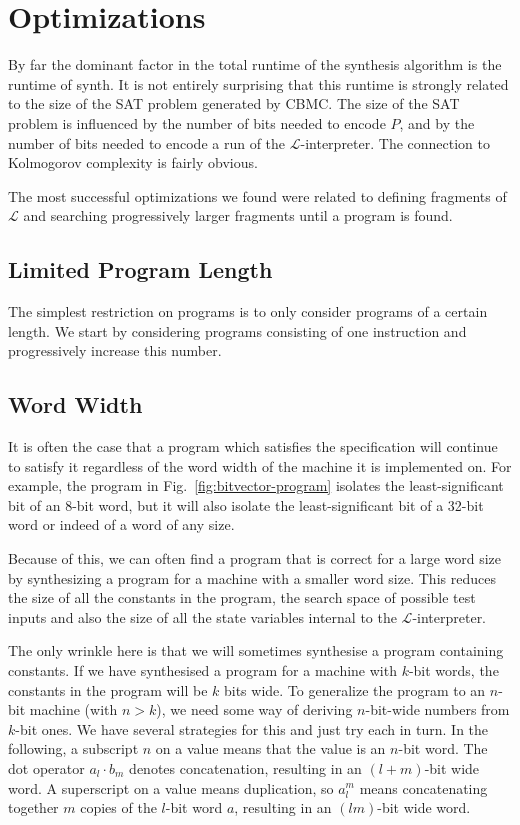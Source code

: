 \documentclass[a4paper]{llncs}
\begin{document}
\section{Optimizations}

By far the dominant factor in the total runtime of the synthesis algorithm is
the runtime of {\sc synth}.  It is not entirely surprising that this runtime
is strongly related to the size of the SAT problem generated by CBMC.  The size
of the SAT problem is influenced by the number of bits needed to encode $P$,
and by the number of bits needed to encode a run of the $\mathcal{L}$-interpreter.
The connection to Kolmogorov complexity is fairly obvious.

The most successful optimizations we found were related to defining
fragments of $\mathcal{L}$ and searching progressively larger fragments
until a program is found.

\subsection{Limited Program Length}

The simplest restriction on programs is to only consider programs of a certain length.
We start by considering programs consisting of one instruction and progressively
increase this number.

\subsection{Word Width}

It is often the case that a program which satisfies the specification will
continue to satisfy it regardless of the word width of the machine it is
implemented on.  For example, the program in Fig.~\ref{fig:bitvector-program}
isolates the least-significant bit of an 8-bit word, but it will also
isolate the least-significant bit of a 32-bit word or indeed of a word of
any size.

Because of this, we can often find a program that is correct for a large
word size by synthesizing a program for a machine with a smaller word size.
This reduces the size of all the constants in the program, the search space
of possible test inputs and also the size of all the state variables internal
to the $\mathcal{L}$-interpreter.

The only wrinkle here is that we will sometimes synthesise a program containing
constants.  If we have synthesised a program for a machine with $k$-bit words,
the constants in the program will be $k$ bits wide.  To generalize the program
to an $n$-bit machine (with $n > k$), we need some way of deriving $n$-bit-wide
numbers from $k$-bit ones.  We have several strategies for this and
just try each in turn.  In the following, a subscript $n$ on a value means that
the value is an $n$-bit word.  The dot operator $a_l \cdot b_m$ denotes
concatenation, resulting in an $(l+m)$-bit wide word.  A superscript on a value
means duplication, so $a_l^m$ means concatenating together $m$ copies of the $l$-bit
word $a$, resulting in an $(lm)$-bit wide word.
\end{document}
